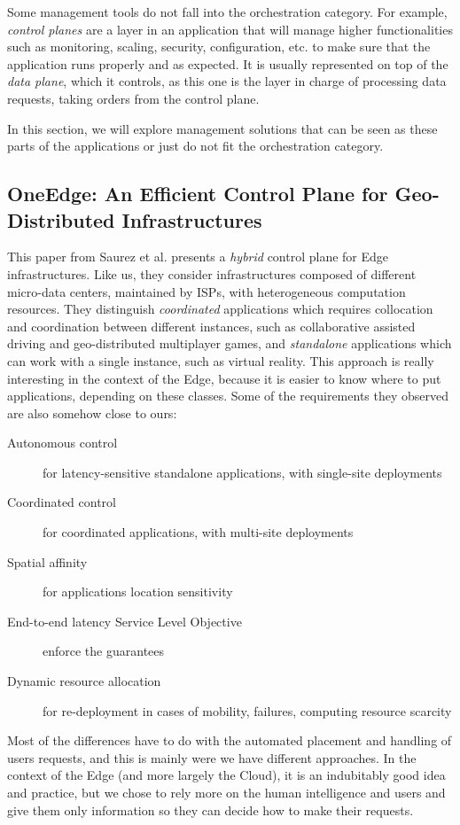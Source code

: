 Some management tools do not fall into the orchestration category.
%
For example, \emph{control planes} are a layer in an application that will
manage higher functionalities such as monitoring, scaling, security,
configuration, etc. to make sure that the application runs properly
and as expected.
%
It is usually represented on top of the \emph{data plane}, which it controls,
as this one is the layer in charge of processing data requests, taking
orders from the control plane.

In this section, we will explore management solutions that can be seen
as these parts of the applications or just do not fit the
orchestration category.

\subsection{OneEdge: An Efficient Control Plane for Geo-Distributed
  Infrastructures~\cite{SGDR21}}
\label{subsec:SGDR21}

This paper from Saurez et al. presents a \emph{hybrid} control plane
for Edge infrastructures.
%
Like us, they consider infrastructures composed of different
micro-data centers, maintained by ISPs, with heterogeneous computation
resources.
%
They distinguish \emph{coordinated} applications which requires
collocation and coordination between different instances, such as
collaborative assisted driving and geo-distributed multiplayer games,
and \emph{standalone} applications which can work with a single
instance, such as virtual reality.
%
This approach is really interesting in the context of the Edge,
because it is easier to know where to put applications, depending on
these classes.
%
Some of the requirements they observed are also somehow close to ours:
\begin{description}
\item[Autonomous control] for latency-sensitive standalone
  applications, with single-site deployments
\item[Coordinated control] for coordinated applications, with
  multi-site deployments
\item[Spatial affinity] for applications location sensitivity
\item[End-to-end latency Service Level Objective] enforce the
  guarantees
\item[Dynamic resource allocation] for re-deployment in cases of
  mobility, failures, computing resource scarcity
\end{description}
Most of the differences have to do with the automated placement and
handling of users requests, and this is mainly were we have different
approaches.
%
In the context of the Edge (and more largely the Cloud), it is an
indubitably good idea and practice, but we chose to rely more on the
human intelligence and users and give them only information so they
can decide how to make their requests.

